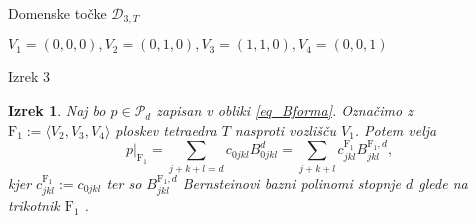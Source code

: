 \documentclass{beamer}
\newtheorem{theorem1}{Izrek}
\begin{document}
\begin{frame}{Domenske točke $\mathcal{D}_{3,T}$}
\begin{tikzpicture}[scale=3, z={(0.6cm,2cm)}]
    \end{tikzpicture}
    $V_1 = (0, 0, 0), V_2 =(0,1, 0), V_3 = (1,1,0), V_4 = (0,0,1) $
\end{frame}


\begin{frame}{Izrek 3}
\begin{theorem1}
    Naj bo $p \in \mathcal{P}_d$ zapisan v obliki \eqref{eq_Bforma}. Označimo 
    z $\text{F}_1 := \langle V_2,V_3,V_4 \rangle$ ploskev tetraedra $T$ nasproti vozlišču $V_1$.
    Potem velja 
    \begin{equation}
        p|_{\text{F}_1} = \sum_{j+k+l = d} c_{0jkl}B_{0jkl}^d = 
            \sum_{j+k+l}c_{jkl}^{\text{F}_1} B_{jkl}^{\text{F}_1,d},
    \end{equation}
    kjer $c_{jkl}^{\text{F}_1}:=c_{0jkl}$ ter so $B_{jkl}^{\text{F}_1,d}$
    Bernsteinovi bazni polinomi stopnje $d$ glede na trikotnik $\text{F}_1$ .
\end{theorem1}
\end{frame}
\end{document}
